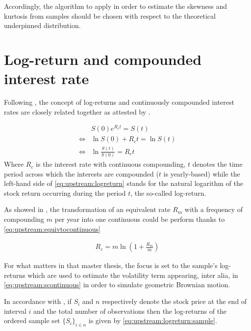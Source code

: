 \documentclass[12pt]{report}
\newcommand{\St}{S\left(t\right)}
\begin{document}
Accordingly, the algorithm to apply in order to estimate the skewness and kurtosis from samples should be chosen with respect to the theoretical underpinned distribution.  

\section{Log-return and compounded interest rate}
\label{sec:upstream:logreturn}

Following \citet{hull}, the concept of log-returns and continuously compounded interest rates are closely related together as attested by .

\begin{align}
&S(0) e^{R_c t} = \St \label{eq:upstream:stock:valued} \\
\Longleftrightarrow  &\ln{S(0)} + R_c t = \ln{\St} \\
\Longleftrightarrow  &\ln{\frac{\St}{S(0)}} = R_c t \label{eq:upstream:logreturn}
\end{align}
Where $R_c$ is the interest rate with continuous compounding, $t$ denotes the time period across which the interests are compounded ($t$ is yearly-based) while the left-hand side of \cref{eq:upstream:logreturn} stands for the natural logarithm of the stock return occurring during the period $t$, the so-called log-return.

As showed in \citet{hull}, the transformation of an equivalent rate $R_m$ with a frequency of compounding $m$ per year into one continuous could be perform thanks to \cref{eq:upstream:equivtocontinuous}

\begin{align}
R_c = m \ln \left( 1 + \frac{R_m}{m} \right) \label{eq:upstream:equivtocontinuous}
\end{align}

For what matters in that master thesis, the focus is set to the sample's log-returns which are used to estimate the volatility term appearing, inter alia, in \cref{eq:upstream:scontinuous} in order to simulate geometric Brownian motion.

In accordance with \citet{hull}, if $S_i$ and $n$ respectively denote the stock price at the end of interval $i$ and the total number of observations then the log-returns of the ordered sample set $\{S_i\}_{i \in n}$ is given by \cref{eq:upstream:logreturn:sample}.
\end{document}
